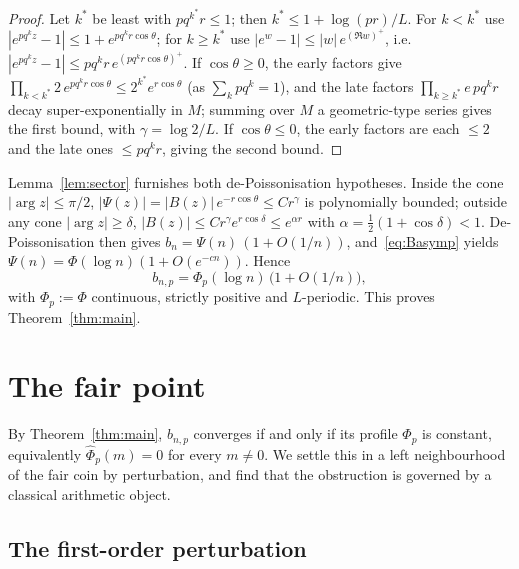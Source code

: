 \documentclass[11pt]{article}
\theoremstyle{definition}
\begin{document}
\begin{proof}
  Let $k^\ast$ be least with $pq^{k^\ast}r\le1$; then $k^\ast\le
  1+\log(pr)/L$. For $k<k^\ast$ use $|e^{pq^kz}-1|\le1+e^{pq^kr
  \cos\theta}$; for $k\ge k^\ast$ use $|e^{w}-1|\le|w|\,e^{(\Re w)^+}$,
  i.e.\ $|e^{pq^kz}-1|\le pq^kr\,e^{(pq^kr\cos\theta)^+}$. If
  $\cos\theta\ge0$, the early factors give $\prod_{k<k^\ast}2\,
  e^{pq^kr\cos\theta}\le2^{k^\ast}e^{r\cos\theta}$ (as
  $\sum_kpq^k=1$), and the late factors $\prod_{k\ge k^\ast}e\,pq^kr$
  decay super-exponentially in $M$; summing over $M$ a geometric-type
  series gives the first bound, with $\gamma=\log2/L$. If
  $\cos\theta\le0$, the early factors are each $\le2$ and the late
  ones $\le pq^kr$, giving the second bound.
\end{proof}

Lemma~\ref{lem:sector} furnishes both de-Poissonisation hypotheses.
Inside the cone $|\arg z|\le\pi/2$, $|\Psi(z)|=|B(z)|\,
e^{-r\cos\theta}\le Cr^{\gamma}$ is polynomially bounded; outside any
cone $|\arg z|\ge\delta$, $|B(z)|\le Cr^{\gamma}e^{r\cos\delta}\le
e^{\alpha r}$ with $\alpha=\tfrac12(1+\cos\delta)<1$.
De-Poissonisation then gives $b_n=\Psi(n)\,(1+O(1/n))$,
and~\eqref{eq:Basymp} yields $\Psi(n)=\Phi(\log n)(1+O(e^{-cn}))$.
Hence
\begin{equation}\label{eq:bnasymp}
  b_{n,p}=\Phi_p(\log n)\,\bigl(1+O(1/n)\bigr),
\end{equation}
with $\Phi_p:=\Phi$ continuous, strictly positive and $L$-periodic.
This proves Theorem~\ref{thm:main}.

\section{The fair point}\label{sec:fair}

By Theorem~\ref{thm:main}, $b_{n,p}$ converges if and only if its
profile $\Phi_p$ is constant, equivalently $\widehat\Phi_p(m)=0$ for
every $m\ne0$. We settle this in a left neighbourhood of the fair coin
by perturbation, and find that the obstruction is governed by a
classical arithmetic object.

\subsection{The first-order perturbation}
\end{document}
